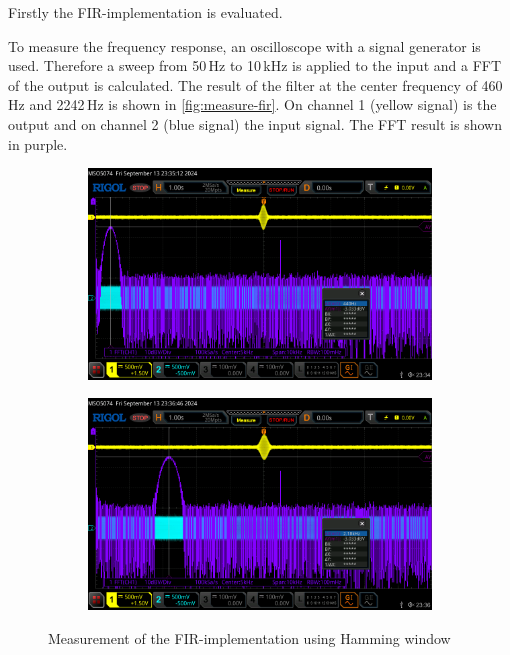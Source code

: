 Firstly the \ac{FIR}-implementation is evaluated.

To measure the frequency response, an oscilloscope with a signal generator is used. Therefore a sweep
from 50\,Hz to 10\,kHz is applied to the input and a \ac{FFT} of the output is calculated. The result
of the filter at the center frequency of 460\,Hz and 2242\,Hz is shown in \autoref{fig:measure-fir}.
On channel 1 (yellow signal) is the output and on channel 2 (blue signal) the input signal. The \ac{FFT}
result is shown in purple.

\begin{figure}[!h]
    \centering
    \begin{subfigure}[c]{0.49\textwidth}
        \centering
        \includegraphics[width=\textwidth]{img/fir_measure_460_hamming.png}
    \end{subfigure}
    \begin{subfigure}[c]{0.49\textwidth}
        \centering
        \includegraphics[width=\textwidth]{img/fir_measure_2242_hamming.png}
    \end{subfigure}
    \caption{Measurement of the \ac{FIR}-implementation using Hamming window}
    \label{fig:measure-fir}
\end{figure}

